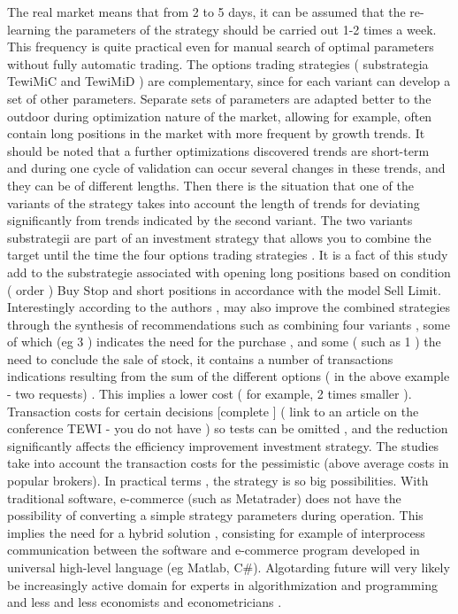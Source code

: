 \documentclass{tewiart}
\begin{document}
The real market means that from 2 to 5 days, it can be assumed that the re- learning the parameters of the strategy should be carried out 1-2 times a week. This frequency is quite practical even for manual search of optimal parameters without fully automatic trading. The options trading strategies ( substrategia TewiMiC and TewiMiD ) are complementary, since for each variant can develop a set of other parameters. Separate sets of parameters are adapted better to the outdoor during optimization nature of the market, allowing for example, often contain long positions in the market with more frequent by growth trends. It should be noted that a further optimizations discovered trends are short-term and during one cycle of validation can occur several changes in these trends, and they can be of different lengths. Then there is the situation that one of the variants of the strategy takes into account the length of trends for deviating significantly from trends indicated by the second variant. The two variants substrategii are part of an investment strategy that allows you to combine the target until the time the four options trading strategies . It is a fact of this study add to the substrategie associated with opening long positions based on condition ( order ) Buy Stop and short positions in accordance with the model Sell Limit. Interestingly according to the authors , may also improve the combined strategies through the synthesis of recommendations such as combining four variants , some of which (eg 3 ) indicates the need for the purchase , and some ( such as 1 ) the need to conclude the sale of stock, it contains a number of transactions indications resulting from the sum of the different options ( in the above example - two requests) . This implies a lower cost ( for example, 2 times smaller ). Transaction costs for certain decisions [complete ] ( link to an article on the conference TEWI - you do not have ) so tests can be omitted , and the reduction significantly affects the efficiency improvement investment strategy. The studies take into account the transaction costs for the pessimistic (above average costs in popular brokers). In practical terms , the strategy is so big possibilities. With traditional software, e-commerce (such as Metatrader) does not have the possibility of converting a simple strategy parameters during operation. This implies the need for a hybrid solution , consisting for example of interprocess communication between the software and e-commerce program developed in universal high-level language (eg Matlab, C\#). Algotarding future will very likely be increasingly active domain for experts in algorithmization and programming and less and less economists and econometricians .
 


\end{document}
